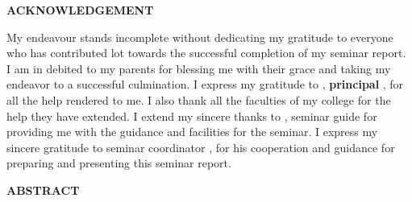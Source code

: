 \documentclass[12pt,a4paper]{report}
\begin{document}
\newpage
{}
\begin{center}
\textbf{ACKNOWLEDGEMENT}
\end{center} 
My endeavour stands incomplete without dedicating my gratitude to everyone who has
contributed lot towards the successful completion of my seminar report. I am in debited
to my parents for blessing me with their grace and taking my endeavor to a successful
culmination. I express my gratitude to \textbf{\guide{}}, \textbf{principal \prince{}}, \instis{} for all the help rendered
to me. I also thank all the faculties of my college for the help they have extended. I
extend my sincere thanks to \textbf{\guide{}}, seminar guide for providing me with the guidance and facilities for the seminar. I
express my sincere gratitude to seminar coordinator \textbf{\coord{}}, for his cooperation and guidance for preparing and presenting this seminar
report.
 
\newpage
\begin{center}
\textbf{ABSTRACT}
\end{center}  

	


\tableofcontents
\listoffigures
\newpage





\newpage



 

\end{document}
